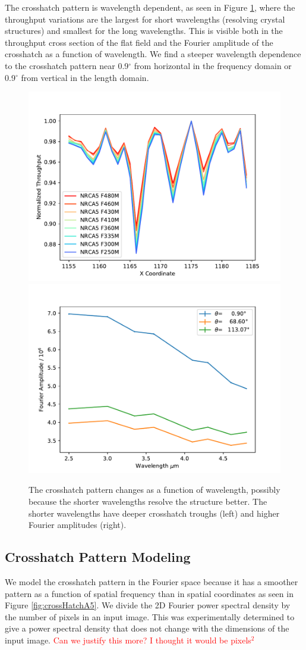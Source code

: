\documentclass{aastex62}
\newcommand{\degree}{^\circ}
\begin{document}
The crosshatch pattern is wavelength dependent, as seen in Figure \ref{fig:crossHatchWavelengthDep}, where the throughput variations are the largest for short wavelengths (resolving crystal structures) and smallest for the long wavelengths.
This is visible both in the throughput cross section of the flat field and the Fourier amplitude of the crosshatch as a function of wavelength.
We find a steeper wavelength dependence to the crosshatch pattern near 0.9$\degree$ from horizontal in the frequency domain or 0.9$\degree$ from vertical in the length domain.

\begin{figure}[!hbtp]
\centering
\includegraphics[width=.49\columnwidth]{cross_sec_of_crosshatch.pdf}
\includegraphics[width=.49\columnwidth]{fourier_power_from_fit.pdf}
\caption{
The crosshatch pattern changes as a function of wavelength, possibly because the shorter wavelengths resolve the structure better.
The shorter wavelengths have deeper crosshatch troughs (left) and higher Fourier amplitudes (right).
}\label{fig:crossHatchWavelengthDep}
\end{figure}


\subsection{Crosshatch Pattern Modeling}
We model the crosshatch pattern in the Fourier space because it has a smoother pattern as a function of spatial frequency than in spatial coordinates as seen in Figure \ref{fig:crossHatchA5}.
We divide the 2D Fourier power spectral density by the number of pixels in an input image.
This was experimentally determined to give a power spectral density that does not change with the dimensions of the input image.
\textcolor{red}{Can we justify this more? I thought it would be pixels$^2$}
\end{document}
